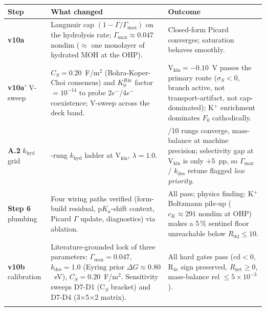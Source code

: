 \documentclass[11pt]{article}
\begin{document}
{\footnotesize
\renewcommand{\arraystretch}{1.25}
\begin{longtable}{@{}>{\raggedright\arraybackslash}p{2.0cm}%
                    >{\raggedright\arraybackslash}p{6.0cm}%
                    >{\raggedright\arraybackslash}p{5.7cm}@{}}
\toprule
\textbf{Step} & \textbf{What changed} & \textbf{Outcome} \\
\midrule
\endhead

\textbf{v10a} &
  Langmuir cap $(1-\Gamma/\Gamma_{\mathrm{max}})$ on the hydrolysis
  rate; $\Gamma_{\mathrm{max}} \approx 0.047$ nondim
  ($\approx$ one monolayer of hydrated MOH at the OHP). &
  Closed-form Picard converges; saturation behaves smoothly. \\
\addlinespace

\textbf{v10a$'$} V-sweep &
  $C_S = 0.20$~F/m$^2$ (Bohra-Koper-Choi consensus) and
  $K_0^{R4e}$ factor $= 10^{-14}$ to probe 2$e^-$/4$e^-$ coexistence;
  V-sweep across the deck band. &
  V$_{\mathrm{kin}} = -0.10$~V passes the primary route
  ($\sigma_S {<} 0$, branch active, not transport-artifact, not
  cap-dominated); K$^+$ enrichment dominates $F_0$ cathodically. \\
\addlinespace

\textbf{A.2}
  $k_{\mathrm{hyd}}$ grid &
  10-rung $k_{\mathrm{hyd}}$ ladder at V$_{\mathrm{kin}}$,
  $\lambda{=}1.0$. &
  10/10 rungs converge, mass-balance at machine precision;
  selectivity gap at V$_{\mathrm{kin}}$ is only $+5$~pp, so
  $\Gamma_{\mathrm{max}}$ / $k_{\mathrm{des}}$ retune flagged
  \emph{low priority}. \\
\addlinespace

\textbf{Step 6} plumbing &
  Four wiring paths verified
  (form-build residual, p$K_a$-shift context, Picard $\Gamma$ update,
  diagnostics) via ablation. &
  All pass; physics finding: K$^+$ Boltzmann pile-up
  ($c_K \approx 291$ nondim at OHP) makes a 5\,\% sentinel floor
  unreachable below $R_{\mathrm{inj}} \leq 10$. \\
\addlinespace

\textbf{v10b} calibration &
  Literature-grounded lock of three parameters:
  $\Gamma_{\mathrm{max}}{=}0.047$,
  $k_{\mathrm{des}}{=}1.0$ (Eyring prior $\Delta G \approx 0.80$~eV),
  $C_S{=}0.20$~F/m$^2$.
  Sensitivity sweeps D7-D1 (C$_S$ bracket) and D7-D4 (3$\times$5$\times$2
  matrix). &
  All hard gates pass (cd${<}0$, R$_{4e}$ sign preserved,
  $R_{\mathrm{net}}\geq 0$, mass-balance rel $\leq 5{\times}10^{-3}$). \\
\addlinespace


\end{longtable}}
\end{document}

